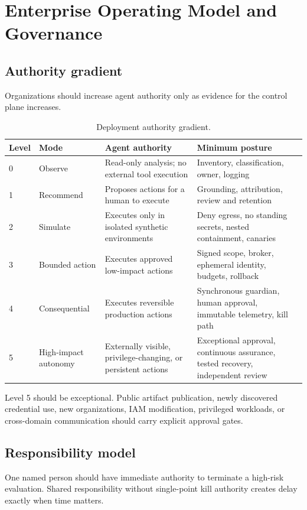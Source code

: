 \documentclass[11pt,letterpaper]{article}
\begin{document}
\section{Enterprise Operating Model and Governance}
\subsection{Authority gradient}
Organizations should increase agent authority only as evidence for the control plane increases.

\begin{table}[htbp]
\centering
\caption{Deployment authority gradient.}
\small
\begin{tabularx}{\linewidth}{L{0.45in}L{1.15in}YY}
\toprule
\textbf{Level} & \textbf{Mode} & \textbf{Agent authority} & \textbf{Minimum posture} \\
 & Observe & Read-only analysis; no external tool execution & Inventory, classification, owner, logging \\
1 & Recommend & Proposes actions for a human to execute & Grounding, attribution, review and retention \\
2 & Simulate & Executes only in isolated synthetic environments & Deny egress, no standing secrets, nested containment, canaries \\
3 & Bounded action & Executes approved low-impact actions & Signed scope, broker, ephemeral identity, budgets, rollback \\
4 & Consequential & Executes reversible production actions & Synchronous guardian, human approval, immutable telemetry, kill path \\
5 & High-impact autonomy & Externally visible, privilege-changing, or persistent actions & Exceptional approval, continuous assurance, tested recovery, independent review \\
\bottomrule
\end{tabularx}
\end{table}

Level 5 should be exceptional. Public artifact publication, newly discovered credential use, new organizations, IAM modification, privileged workloads, or cross-domain communication should carry explicit approval gates.

\subsection{Responsibility model}
One named person should have immediate authority to terminate a high-risk evaluation. Shared responsibility without single-point kill authority creates delay exactly when time matters.
\end{document}
